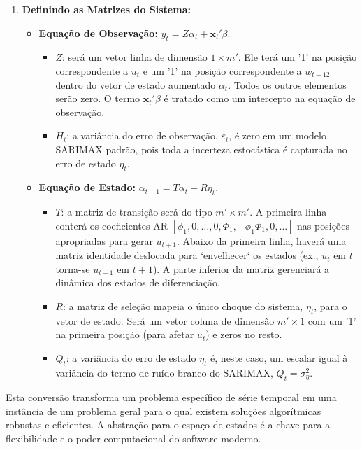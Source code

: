 \documentclass[ 12pt,a4paper ]{article} %
\begin{document}
\begin{enumerate}
		\item \textbf{Definindo as Matrizes do Sistema:}
		\begin{itemize}
			\item \textbf{Equação de Observação:} $y_t = Z \alpha_t + \mathbf{x}_t'\beta$.
			\begin{itemize}
				\item $Z$: será um vetor linha de dimensão $1 \times m'$. Ele terá um '1' na posição correspondente a $u_t$ e um '1' na posição correspondente a $w_{t-12}$ dentro do vetor de estado aumentado $\alpha_t$. Todos os outros elementos serão zero. O termo $\mathbf{x}_t'\beta$ é tratado como um intercepto na equação de observação.
				
				\item $H_t$: a variância do erro de observação, $\varepsilon_t$, é zero em um modelo SARIMAX padrão, pois toda a incerteza estocástica é capturada no erro de estado $\eta_t$.
				
			\end{itemize}
			\item \textbf{Equação de Estado:} $\alpha_{t+1} = T \alpha_t + R \eta_{t}$.
			
			\begin{itemize}
				\item $T$: a matriz de transição será do tipo $m' \times m'$. A primeira linha conterá os coeficientes AR $[\phi_1, 0, \dots, 0, \Phi_1, -\phi_1 \Phi_1, 0, \dots]$ nas posições apropriadas para gerar $u_{t+1}$. Abaixo da primeira linha, haverá uma matriz identidade deslocada para `envelhecer` os estados (ex., $u_t$ em $t$ torna-se $u_{t-1}$ em $t+1$). A parte inferior da matriz gerenciará a dinâmica dos estados de diferenciação.
				
				\item $R$: a matriz de seleção mapeia o único choque do sistema, $\eta_t$, para o vetor de estado. Será um vetor coluna de dimensão $m' \times 1$ com um '1' na primeira posição (para afetar $u_t$) e zeros no resto.
				
				\item $Q_t$: a variância do erro de estado $\eta_t$ é, neste caso, um escalar igual à variância do termo de ruído branco do SARIMAX, $Q_t = \sigma^2_\eta$.
			\end{itemize}
		\end{itemize}
	\end{enumerate}
	
	Esta conversão transforma um problema específico de série temporal em uma instância de um problema geral para o qual existem soluções algorítmicas robustas e eficientes. A abstração para o espaço de estados é a chave para a flexibilidade e o poder computacional do software moderno.
	
\end{document}
